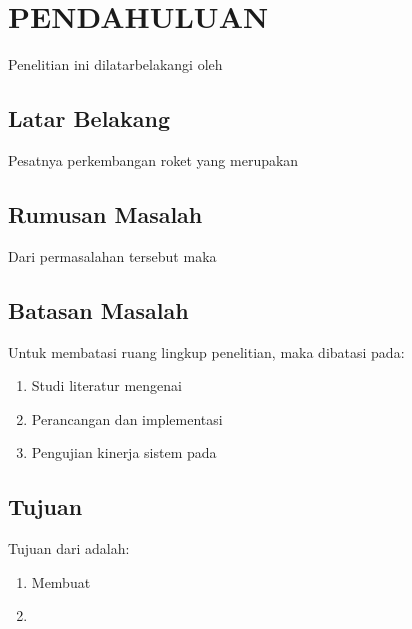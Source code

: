\chapter{PENDAHULUAN}
\label{chap:pendahuluan}


Penelitian ini dilatarbelakangi oleh \lipsum[1][1-5]

\section{Latar Belakang}
\label{sec:latar-belakang}

Pesatnya perkembangan roket yang merupakan \lipsum[1]

\lipsum[2]

\section{Rumusan Masalah}
\label{sec:rumusan-masalah}

Dari permasalahan tersebut maka \lipsum[1][1-6]

\section{Batasan Masalah}
\label{sec:batasan-masalah}

Untuk membatasi ruang lingkup penelitian, maka \lipsum[1][1-4]
dibatasi pada:
\begin{enumerate}[itemsep=1pt]

  \item Studi literatur mengenai \lipsum[2]

  \item Perancangan dan implementasi \lipsum[3]

  \item Pengujian kinerja sistem pada \lipsum[4]
  
\end{enumerate}

\section{Tujuan}
\label{sec:tujuan}

Tujuan dari \lipsum[1][1-3] adalah:

\begin{enumerate}[nolistsep]

  \item Membuat \lipsum[2][1-3]

  \item \lipsum[3][1-3]

\end{enumerate}

